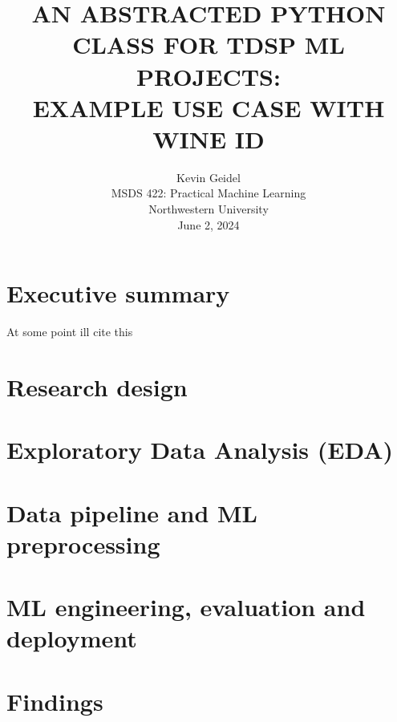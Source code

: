 \documentclass[12pt,letterpaper]{article}
\begin{document}
\selectfont
{}
\doublespacing
\setlength{\droptitle}{1in} 

\title{\large{AN ABSTRACTED PYTHON CLASS FOR TDSP ML PROJECTS: \\ EXAMPLE USE CASE WITH WINE ID \\\vspace{1.2in}}}

\author{
Kevin Geidel \\
MSDS 422: Practical Machine Learning \\
Northwestern University \\
June 2, 2024 \\
}

\date{}
\maketitle
\thispagestyle{empty}	
\clearpage
\setcounter{page}{1}

\section{Executive summary}
\tab At some point ill cite this \citep{tdsp:2024}

\section{Research design}
\tab 

\section{Exploratory Data Analysis (EDA)}
\tab 

\section{Data pipeline and ML preprocessing}
\tab 

\section{ML engineering, evaluation and deployment}
\tab 

\section{Findings}
\tab 
\end{document}
